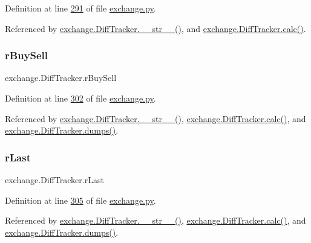 Definition at line \hyperlink{exchange_8py_source_l00291}{291} of file \hyperlink{exchange_8py_source}{exchange.\+py}.



Referenced by \hyperlink{exchange_8py_source_l00336}{exchange.\+Diff\+Tracker.\+\_\+\+\_\+str\+\_\+\+\_\+()}, and \hyperlink{exchange_8py_source_l00309}{exchange.\+Diff\+Tracker.\+calc()}.

\mbox{\label{classexchange_1_1_diff_tracker_aab406fe7b4dc6d486c4a9fb65944a4df}} 
\subsubsection{\texorpdfstring{r\+Buy\+Sell}{rBuySell}}
{\footnotesize\ttfamily exchange.\+Diff\+Tracker.\+r\+Buy\+Sell}



Definition at line \hyperlink{exchange_8py_source_l00302}{302} of file \hyperlink{exchange_8py_source}{exchange.\+py}.



Referenced by \hyperlink{exchange_8py_source_l00336}{exchange.\+Diff\+Tracker.\+\_\+\+\_\+str\+\_\+\+\_\+()}, \hyperlink{exchange_8py_source_l00309}{exchange.\+Diff\+Tracker.\+calc()}, and \hyperlink{exchange_8py_source_l00385}{exchange.\+Diff\+Tracker.\+dumps()}.

\mbox{\label{classexchange_1_1_diff_tracker_a4dbaf0a1192448101cb35eca617c7f0f}} 
\subsubsection{\texorpdfstring{r\+Last}{rLast}}
{\footnotesize\ttfamily exchange.\+Diff\+Tracker.\+r\+Last}



Definition at line \hyperlink{exchange_8py_source_l00305}{305} of file \hyperlink{exchange_8py_source}{exchange.\+py}.



Referenced by \hyperlink{exchange_8py_source_l00336}{exchange.\+Diff\+Tracker.\+\_\+\+\_\+str\+\_\+\+\_\+()}, \hyperlink{exchange_8py_source_l00309}{exchange.\+Diff\+Tracker.\+calc()}, and \hyperlink{exchange_8py_source_l00385}{exchange.\+Diff\+Tracker.\+dumps()}.

